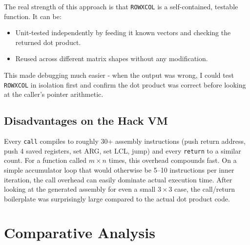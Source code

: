\documentclass[12pt,a4paper]{article}
\begin{document}
The real strength of this approach is that \texttt{ROWXCOL} is a self-contained, testable function. It can be:
\begin{itemize}
    \item Unit-tested independently by feeding it known vectors and checking the returned dot product.
    \item Reused across different matrix shapes without any modification.
\end{itemize}

This made debugging much easier - when the output was wrong, I could test \texttt{ROWXCOL} in isolation first and confirm the dot product was correct before looking at the caller's pointer arithmetic.

\subsection{Disadvantages on the Hack VM}

Every \texttt{call} compiles to roughly 30+ assembly instructions (push return address, push 4 saved registers, set ARG, set LCL, jump) and every \texttt{return} to a similar count. For a function called $m \times n$ times, this overhead compounds fast. On a simple accumulator loop that would otherwise be 5--10 instructions per inner iteration, the call overhead can easily dominate actual execution time. After looking at the generated assembly for even a small $3 \times 3$ case, the call/return boilerplate was surprisingly large compared to the actual dot product code.

\section{Comparative Analysis}
\end{document}
